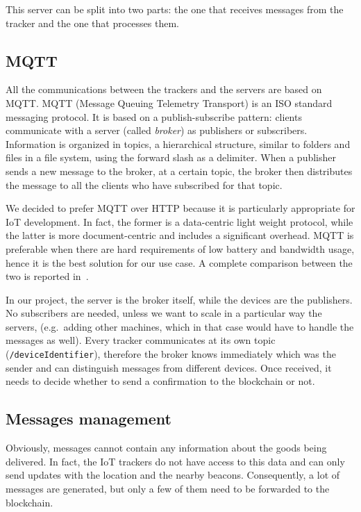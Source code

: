This server can be split into two parts: the one that receives messages from the tracker and the one that processes them.

\subsection{MQTT}
\label{sec:mqtt}
All the communications between the trackers and the servers are based on MQTT. MQTT (Message Queuing Telemetry Transport) is an ISO standard messaging protocol. It is based on a publish-subscribe pattern: clients communicate with a server (called \emph{broker}) as publishers or subscribers. Information is organized in topics, a hierarchical structure, similar to folders and files in a file system, using the forward slash as a delimiter. When a publisher sends a new message to the broker, at a certain topic, the broker then distributes the message to all the clients who have subscribed for that topic.

We decided to prefer MQTT over HTTP because it is particularly appropriate for IoT development. In fact, the former is a data-centric light weight protocol, while the latter is more document-centric and includes a significant overhead. MQTT is preferable when there are hard requirements of low battery and bandwidth usage, hence it is the best solution for our use case. A complete comparison between the two is reported in~\cite{httpVSmqtt}.

In our project, the server is the broker itself, while the devices are the publishers. No subscribers are needed, unless we want to scale in a particular way the servers, (e.g.\ adding other machines, which in that case would have to handle the messages as well). Every tracker communicates at its own topic (\texttt{/deviceIdentifier}), therefore the broker knows immediately which was the sender and can distinguish messages from different devices. Once received, it needs to decide whether to send a confirmation to the blockchain or not.

\subsection{Messages management}
Obviously, messages cannot contain any information about the goods being delivered. In fact, the IoT trackers do not have access to this data and can only send updates with the location and the nearby beacons. Consequently, a lot of messages are generated, but only a few of them need to be forwarded to the blockchain.

